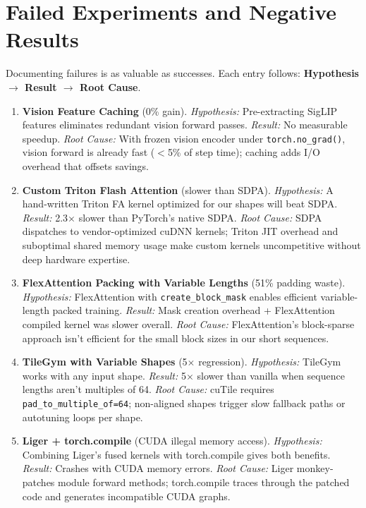 \documentclass[11pt,a4paper]{article}
\begin{document}
\section{Failed Experiments and Negative Results}
\label{sec:failures}

Documenting failures is as valuable as successes. Each entry follows:
\textbf{Hypothesis $\to$ Result $\to$ Root Cause}.

\begin{enumerate}[leftmargin=*]

\item \textbf{Vision Feature Caching} (0\% gain).
  \textit{Hypothesis:} Pre-extracting SigLIP features eliminates redundant vision forward passes.
  \textit{Result:} No measurable speedup.
  \textit{Root Cause:} With frozen vision encoder under \texttt{torch.no\_grad()}, vision
  forward is already fast ($<$5\% of step time); caching adds I/O overhead that offsets savings.

\item \textbf{Custom Triton Flash Attention} (slower than SDPA).
  \textit{Hypothesis:} A hand-written Triton FA kernel optimized for our shapes will beat SDPA.
  \textit{Result:} 2.3$\times$ slower than PyTorch's native SDPA.
  \textit{Root Cause:} SDPA dispatches to vendor-optimized cuDNN kernels; Triton JIT overhead
  and suboptimal shared memory usage make custom kernels uncompetitive without deep hardware expertise.

\item \textbf{FlexAttention Packing with Variable Lengths} (51\% padding waste).
  \textit{Hypothesis:} FlexAttention with \texttt{create\_block\_mask} enables efficient
  variable-length packed training.
  \textit{Result:} Mask creation overhead + FlexAttention compiled kernel was slower overall.
  \textit{Root Cause:} FlexAttention's block-sparse approach isn't efficient for the
  small block sizes in our short sequences.

\item \textbf{TileGym with Variable Shapes} (5$\times$ regression).
  \textit{Hypothesis:} TileGym works with any input shape.
  \textit{Result:} 5$\times$ slower than vanilla when sequence lengths aren't multiples of 64.
  \textit{Root Cause:} cuTile requires \texttt{pad\_to\_multiple\_of=64}; non-aligned shapes
  trigger slow fallback paths or autotuning loops per shape.

\item \textbf{Liger + torch.compile} (CUDA illegal memory access).
  \textit{Hypothesis:} Combining Liger's fused kernels with torch.compile gives both benefits.
  \textit{Result:} Crashes with CUDA memory errors.
  \textit{Root Cause:} Liger monkey-patches module forward methods; torch.compile traces
  through the patched code and generates incompatible CUDA graphs.


\end{enumerate}
\end{document}
